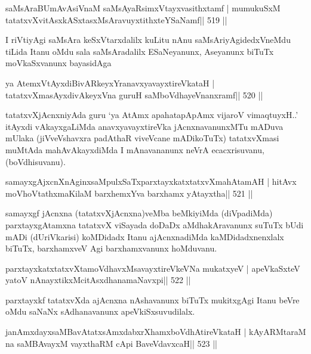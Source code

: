 \begin{shl}
saMsAraBUmAvAsiVnaM saMsAyaRsimxVtayxvasithxtamf |
mumukuSxM tatatxvXvitAsxkASxtasxMsAravuyxtithxteYSaNamf\hfill || 519 ||
\end{shl}

\begin{artha}
I riVtiyAgi saMsAra keSxVtarxdalilx kuLitu nAnu saMsAriyAgidedxVneMdu
tiLida Itanu oMdu sala saMsAradalilx ESaNeyanunx, Aseyanunx biTuTx
moVkaSxvanunx bayasidAga 
\end{artha}

\begin{shl}
ya AtemxVtAyxdiBivARkeyxYranavxyavayxtireVkataH |
tatatxvXmasAyxdivAkeyxVna guruH saMboVdhayeVnanxramf\hfill || 520 ||
\end{shl}

\begin{artha}
tatatxvXjAcnxniyAda guru `ya AtAmx apahatapApAmx vijaroV vimaqtuyxH..' itAyxdi vAkayxgaLiMda anavxyavayxtireVka jAcnxnavanunxMTu mADuva mUlaka (jiVveVshavxra padAthaR viveVcane mADikoTuTx) tatatxvXmasi muMtAda mahAvAkayxdiMda I mAnavananunx neVrA ecacxrisuvanu, (boVdhisuvanu).
\end{artha}

\begin{shl}
samayxgAjxcnXnAginxsaMpulxSaTxparxtayxkatxtatxvXmahAtamAH |
hitAvx moVhoVtathxmaKilaM barxhemxYva barxhamx yAtayxtha\hfill || 521 ||
\end{shl}

\begin{artha}
samayxgf jAcnxna (tatatxvXjAcnxna)veMba beMkiyiMda (diVpadiMda)
parxtayxgAtamxna tatatxvX viSayada doDaDx aMdhakAravanunx suTuTx bUdi
mADi (dUriVkarisi) koMDidadx Itanu ajAcnxnadiMda kaMDidadxnenxlalx
biTuTx, barxhamxveV Agi barxhamxvanunx hoMduvanu.
\end{artha}

\begin{shl}
parxtayxkatxtatxvXtamoVdhavxMsavayxtireVkeVNa mukatxyeV |
apeVkaSxteV yatoV nAnayxtikxMcitAsxdhanamaNavxpi\hfill || 522 ||
\end{shl}

\begin{artha}
parxtayxkf tatatxvXda ajAcnxna nAshavanunx biTuTx mukitxgAgi Itanu beVre
oMdu saNaNx sAdhanavanunx apeVkiSxsuvudilalx.
\end{artha}

\begin{shl}
janAmxdayxsaMBavAtatxsAmxdabxrXhamxboVdhAtireVkataH |
kAyARMtaraM na saMBAvayxM vayxthaRM cApi BaveVdavxcaH\hfill || 523 ||
\end{shl}

